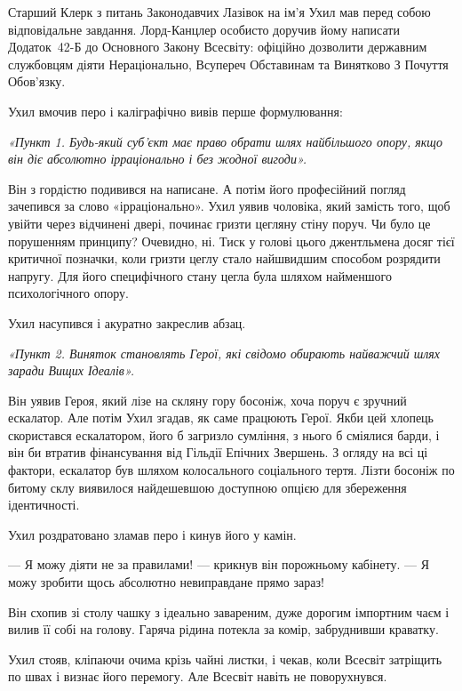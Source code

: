 \documentclass[12pt, a4paper, openany]{book}
\begin{document}
\begin{terrybox}
Старший Клерк з питань Законодавчих Лазівок на ім'я Ухил мав перед собою відповідальне завдання. Лорд-Канцлер особисто доручив йому написати Додаток~42-Б до Основного Закону Всесвіту: офіційно дозволити державним службовцям діяти Нераціонально, Всупереч Обставинам та Винятково З Почуття Обов'язку.

Ухил вмочив перо і каліграфічно вивів перше формулювання:

\medskip
\textit{«Пункт 1. Будь-який суб'єкт має право обрати шлях найбільшого опору, якщо він діє абсолютно ірраціонально і без жодної вигоди».}

\medskip
Він з гордістю подивився на написане. А потім його професійний погляд зачепився за слово «ірраціонально». Ухил уявив чоловіка, який замість того, щоб увійти через відчинені двері, починає гризти цегляну стіну поруч. Чи було це порушенням принципу? Очевидно, ні. Тиск у голові цього джентльмена досяг тієї критичної позначки, коли гризти цеглу стало найшвидшим способом розрядити напругу. Для його специфічного стану цегла була шляхом найменшого психологічного опору.

Ухил насупився і акуратно закреслив абзац.

\medskip
\textit{«Пункт 2. Виняток становлять Герої, які свідомо обирають найважчий шлях заради Вищих Ідеалів».}

\medskip
Він уявив Героя, який лізе на скляну гору босоніж, хоча поруч є зручний ескалатор. Але потім Ухил згадав, як саме працюють Герої. Якби цей хлопець скористався ескалатором, його б загризло сумління, з нього б сміялися барди, і він би втратив фінансування від Гільдії Епічних Звершень. З огляду на всі ці фактори, ескалатор був шляхом колосального соціального тертя. Лізти босоніж по битому склу виявилося найдешевшою доступною опцією для збереження ідентичності.

Ухил роздратовано зламав перо і кинув його у камін.

--- Я можу діяти не за правилами! --- крикнув він порожньому кабінету. --- Я можу зробити щось абсолютно невиправдане прямо зараз!

Він схопив зі столу чашку з ідеально завареним, дуже дорогим імпортним чаєм і вилив її собі на голову. Гаряча рідина потекла за комір, забруднивши краватку.

Ухил стояв, кліпаючи очима крізь чайні листки, і чекав, коли Всесвіт затріщить по швах і визнає його перемогу. Але Всесвіт навіть не поворухнувся.


\end{terrybox}
\end{document}

